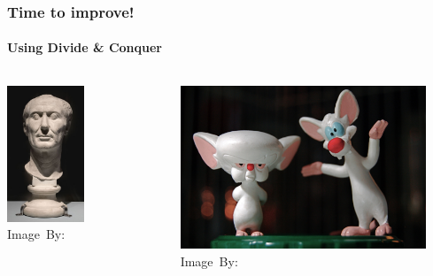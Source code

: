 \begin{frame}
	\frametitle{Time to improve!}
	\framesubtitle{Using Divide \& Conquer}
		\begin{columns}
			\begin{center}
				\includegraphics[width=0.5\textwidth]{figures/ceasar.jpg}\\
				\hspace*{15pt}\hbox{\scriptsize Image By:}
			\end{center}

			\begin{center}
				\includegraphics[width=0.9\textwidth]{figures/pinky.jpg}\\
				\hspace*{15pt}\hbox{\scriptsize Image By:}

			\end{center}
		\end{columns}
\end{frame}

